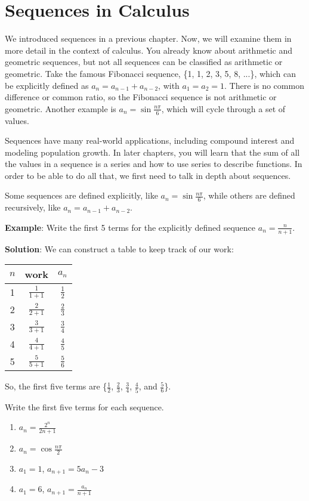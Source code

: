 \chapter{Sequences in Calculus}
We introduced sequences in a previous chapter. Now, we will examine them 
in more detail in the context of calculus. You already know about arithmetic and 
geometric sequences, but not all sequences can be classified as arithmetic or 
geometric. Take the famous Fibonacci sequence, \{1, 1, 2, 3, 5, 8, ...\}, 
which can be explicitly defined as $a_n = a_{n-1} + a_{n-2}$, with $a_1 = a_2 
= 1$. There is no common difference or common ratio, so the Fibonacci sequence 
is not arithmetic or geometric. Another example is $a_n = \sin{\frac{n\pi}{6}}$, 
which will cycle through a set of values. 

Sequences have many real-world applications, including compound interest and 
modeling population growth. In later chapters, you will learn that the sum of 
all the values in a sequence is a series and how to use series to describe 
functions. In order to be able to do all that, we first need to talk in depth 
about sequences. 

Some sequences are defined explicitly, like $a_n = \sin{\frac{n\pi}{6}}$, while 
others are defined recursively, like $a_n = a_{n-1} + a_{n-2}$. 

\textbf{Example}: Write the first 5 terms for the explicitly defined sequence $a_n = 
\frac{n}{n+1}$.

\textbf{Solution}: We can construct a table to keep track of our work:
\begin{center}
\begin{tabular}{|c|c|c|}\hline
$n$ & work & $a_n$\\
\hline
1 & $\frac{1}{1+1}$ & $\frac{1}{2}$\\
\hline
2 & $\frac{2}{2+1}$ & $\frac{2}{3}$\\
\hline
3 & $\frac{3}{3+1}$ & $\frac{3}{4}$\\
\hline
4 & $\frac{4}{4+1}$ & $\frac{4}{5}$\\
\hline
5 & $\frac{5}{5+1}$ & $\frac{5}{6}$\\
\hline
\end{tabular}
\end{center}

So, the first five terms are \{$\frac{1}{2}$, $\frac{2}{3}$, $\frac{3}{4}$, 
$\frac{4}{5}$, and $\frac{5}{6}$\}. 

\begin{Exercise}[label = seqcalc1]
Write the first five terms for each sequence. 
\begin{enumerate}
\item $a_n = \frac{2^n}{2n+1}$
\item $a_n = \cos{\frac{n\pi}{2}}$
\item $a_1 = 1$, $a_{n+1} = 5a_n-3$
\item $a_1 = 6$, $a_{n+1} = \frac{a_n}{n+1}$
\end{enumerate}
\end{Exercise}

